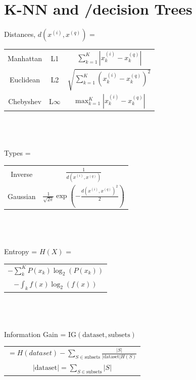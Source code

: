 \documentclass[a4paper, 10pt, twocolumn]{article}
\begin{document}
\section{K-NN and /decision Trees}
Distances, $d(x^{(i)},x^{(q)})$ = \\
\begin{tabular}{ c c c }
	Manhattan & L1 & $\sum^{K}_{k=1}|x^{(i)}_{k} - x_{k}^{(q)}|$ \\ 
	Euclidean & L2 & $\sqrt{\sum^{K}_{k=1}(x^{(i)}_{k} - x_{k}^{(q)})^2}$  \\  
	Chebyshev & L$\infty$ & $\max^K_{k=1}|x^{(i)}_{k} - x_{k}^{(q)}|$    
\end{tabular} \\ \\ \\
Types = 
\begin{tabular}{ c c }
	Inverse & $\frac{1}{d(x^{(i)},x^{(q)})}$ \\ 
	Gaussian & $\frac{1}{\sqrt{2 \pi}}\exp(-\frac{d(x^{(i)},x^{(q)})^2}{2})$  \\     
\end{tabular} \\ \\ \\
Entropy = $H(X)$ =
\begin{tabular}{ c }
	$-\sum^K_k P(x_k) \log_2(P(x_k))$ \\
	$-\int_k f(x) \log_2(f(x))$
\end{tabular} \\ \\ \\
Information Gain = $\textrm{IG}(\textrm{dataset},\textrm{subsets})$\\ 
\begin{tabular} {c}
	$ = H(dataset) - \sum_{S \in \textrm{subsets}} \frac{|S|}{|\textrm{dataset}|H(S)}$ \\
	$|\textrm{dataset}| = \sum_{S \in \textrm{subsets}} |S|$
\end{tabular}
\end{document}
